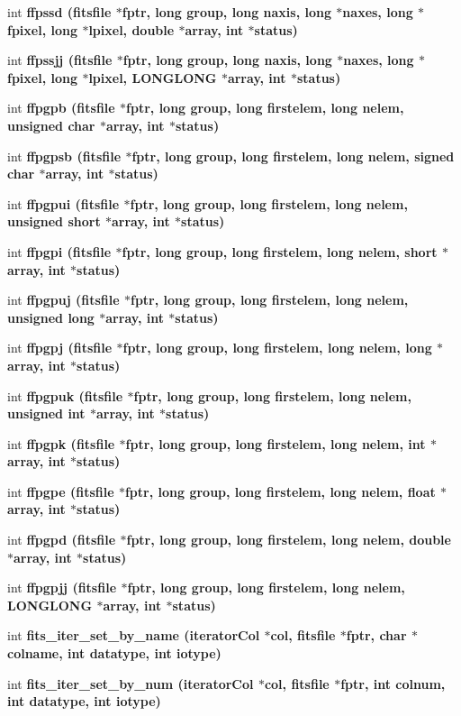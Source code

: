 \begin{CompactItemize}
int \bf{ffpssd} (\bf{fitsfile} $\ast$fptr, long group, long naxis, long $\ast$naxes, long $\ast$fpixel, long $\ast$lpixel, double $\ast$array, int $\ast$status)
\item 
int \bf{ffpssjj} (\bf{fitsfile} $\ast$fptr, long group, long naxis, long $\ast$naxes, long $\ast$fpixel, long $\ast$lpixel, \bf{LONGLONG} $\ast$array, int $\ast$status)
\item 
int \bf{ffpgpb} (\bf{fitsfile} $\ast$fptr, long group, long firstelem, long nelem, unsigned char $\ast$array, int $\ast$status)
\item 
int \bf{ffpgpsb} (\bf{fitsfile} $\ast$fptr, long group, long firstelem, long nelem, signed char $\ast$array, int $\ast$status)
\item 
int \bf{ffpgpui} (\bf{fitsfile} $\ast$fptr, long group, long firstelem, long nelem, unsigned short $\ast$array, int $\ast$status)
\item 
int \bf{ffpgpi} (\bf{fitsfile} $\ast$fptr, long group, long firstelem, long nelem, short $\ast$array, int $\ast$status)
\item 
int \bf{ffpgpuj} (\bf{fitsfile} $\ast$fptr, long group, long firstelem, long nelem, unsigned long $\ast$array, int $\ast$status)
\item 
int \bf{ffpgpj} (\bf{fitsfile} $\ast$fptr, long group, long firstelem, long nelem, long $\ast$array, int $\ast$status)
\item 
int \bf{ffpgpuk} (\bf{fitsfile} $\ast$fptr, long group, long firstelem, long nelem, unsigned int $\ast$array, int $\ast$status)
\item 
int \bf{ffpgpk} (\bf{fitsfile} $\ast$fptr, long group, long firstelem, long nelem, int $\ast$array, int $\ast$status)
\item 
int \bf{ffpgpe} (\bf{fitsfile} $\ast$fptr, long group, long firstelem, long nelem, float $\ast$array, int $\ast$status)
\item 
int \bf{ffpgpd} (\bf{fitsfile} $\ast$fptr, long group, long firstelem, long nelem, double $\ast$array, int $\ast$status)
\item 
int \bf{ffpgpjj} (\bf{fitsfile} $\ast$fptr, long group, long firstelem, long nelem, \bf{LONGLONG} $\ast$array, int $\ast$status)
\item 
int \bf{fits\_\-iter\_\-set\_\-by\_\-name} (\bf{iterator\-Col} $\ast$col, \bf{fitsfile} $\ast$fptr, char $\ast$colname, int \bf{datatype}, int iotype)
\item 
int \bf{fits\_\-iter\_\-set\_\-by\_\-num} (\bf{iterator\-Col} $\ast$col, \bf{fitsfile} $\ast$fptr, int colnum, int \bf{datatype}, int iotype)

\end{CompactItemize}
